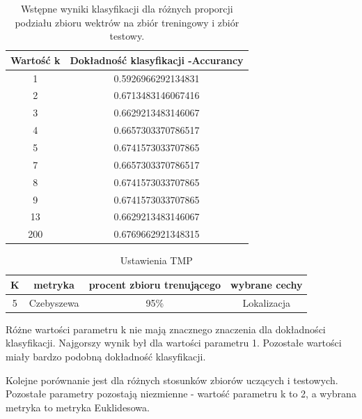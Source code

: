 \documentclass{classrep}
\begin{document}
\begin{table}[h!]
 \caption{Wstępne wyniki klasyfikacji dla różnych proporcji podziału zbioru wektrów na zbiór treningowy i zbiór testowy.}
 \centering
 \vspace{0.1cm}
 \begin{tabular}{c c}
  \textbf{Wartość k} & \textbf{Dokładność klasyfikacji -Accurancy}\\
\hline
  1 &  0.5926966292134831\\
  2 &   0.6713483146067416\\
  3 &  0.6629213483146067\\
  4 &  0.6657303370786517\\
  5 &  0.6741573033707865\\
  7 & 0.6657303370786517\\
  8 &  0.6741573033707865\\
  9 &   0.6741573033707865\\
 13  & 0.6629213483146067\\
200 &   0.6769662921348315 \\
 \end{tabular}
 \label{wyniki klasyfikacji dla różnych proporcji podziału zbioru wektrów na zbiór treningowy i zbiór testowy.}
\end{table}

\begin{table}[h!]
\caption{Ustawienia TMP}
\centering
\vspace{0.1cm}
 \begin{tabular}{c c c c}

	\textbf{K} & \textbf{metryka}   & \textbf{procent zbioru trenującego}  & \textbf{wybrane cechy}   \\
\hline
5 & Czebyszewa & 95\% & Lokalizacja \\


\end {tabular}
\label {coś}
\end{table}

Różne wartości parametru k nie mają znacznego znaczenia dla dokładności klasyfikacji. Najgorszy wynik był dla wartości parametru 1. Pozostałe wartości miały bardzo podobną dokładność klasyfikacji. 

\newpage
Kolejne porównanie jest dla różnych stosunków zbiorów uczących i testowych. Pozostałe parametry pozostają niezmienne - wartość parametru k to 2, a wybrana metryka to metryka Euklidesowa.
\end{document}
